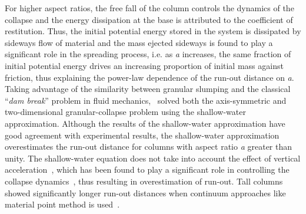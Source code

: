 For higher 
aspect ratios, the free fall of the column controls the dynamics of the 
collapse and the energy dissipation at the base is attributed to the 
coefficient of restitution. Thus, the initial potential energy stored in the 
system is dissipated by sideways flow of material and the mass ejected sideways 
is found to play a significant role in the spreading process, i.e. as 
\textit{a} increases, the same fraction of initial potential energy drives an 
increasing proportion of initial mass against friction, thus explaining the 
power-law dependence of the run-out distance on \textit{a}. Taking advantage 
of the similarity between granular slumping and the classical ``\textit{dam 
break}'' problem in fluid mechanics,~\citet{Kerswell2005} solved both the 
axis-symmetric and two-dimensional granular-collapse problem using the 
shallow-water approximation. Although the results of the shallow-water 
approximation have good agreement with experimental results, the shallow-water 
approximation overestimates the run-out distance for columns with aspect ratio 
\textit{a} greater than unity. The shallow-water equation does not take into 
account the effect of vertical acceleration~\citep{Lajeunesse2005}, which has 
been found to play a significant role in controlling the collapse 
dynamics~\citet{Staron2005}, thus resulting in overestimation of run-out. Tall 
columns showed significantly longer run-out distances when continuum approaches 
like material point method is used~\citep{Bandara2013,Mast2014}.

